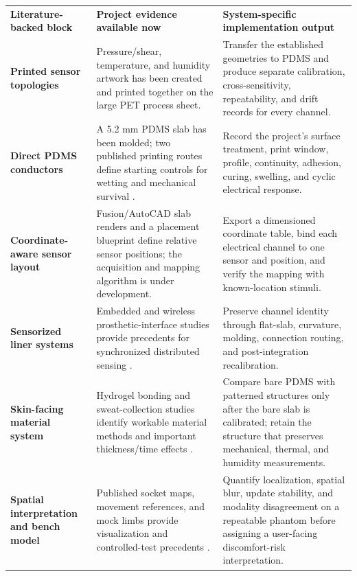 \clearpage
{}

\hypertarget{q2-synthesis}{}

\begingroup
\fontsize{8.5}{10}\selectfont
\renewcommand{\arraystretch}{1.1}
\begin{tabularx}{\linewidth}{>{\raggedright\arraybackslash\bfseries\color{AUBRed}}p{2.9cm}Y Y}
\color{white}\textbf{Literature-backed block} &
\color{white}\textbf{Project evidence available now} &
\color{white}\textbf{System-specific implementation output} \\
Printed sensor topologies & Pressure/shear, temperature, and humidity artwork
has been created and printed together on the large PET process sheet. & Transfer
the established geometries to PDMS and produce separate calibration,
cross-sensitivity, repeatability, and drift records for every channel. \\
Direct PDMS conductors & A 5.2 mm PDMS slab has been molded; two published
printing routes define starting controls for wetting and mechanical survival
\cite{albrecht2018stretch,sun2016}. & Record the project's surface treatment,
print window, profile, continuity, adhesion, curing, swelling, and cyclic
electrical response. \\
Coordinate-aware sensor layout & Fusion/AutoCAD slab renders and a placement
blueprint define relative sensor positions; the acquisition and mapping
algorithm is under development. & Export a dimensioned coordinate table, bind
each electrical channel to one sensor and position, and verify the mapping with
known-location stimuli. \\
Sensorized liner systems & Embedded and wireless prosthetic-interface studies
provide precedents for synchronized distributed sensing
\cite{paterno2020,q3kwak2020}. & Preserve channel identity through flat-slab,
curvature, molding, connection routing, and post-integration recalibration. \\
Skin-facing material system & Hydrogel bonding and sweat-collection studies
identify workable material methods and important thickness/time effects
\cite{yuk2016,lu2025}. & Compare bare PDMS with patterned structures only after
the bare slab is calibrated; retain the structure that preserves mechanical,
thermal, and humidity measurements. \\
Spatial interpretation and bench model & Published socket maps, movement
references, and mock limbs provide visualization and controlled-test precedents
\cite{q3turner2021,noll2018,quinlan2020,phillips2025}. & Quantify localization,
spatial blur, update stability, and modality disagreement on a repeatable phantom
before assigning a user-facing discomfort-risk interpretation. \\
\end{tabularx}
\endgroup
{}

